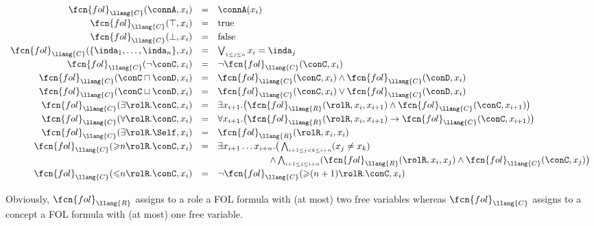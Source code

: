 \[
\begin{array}{rll}
	 \fcn{fol}_{ \llang{C}}(\connA,x_i) & = & \connA(x_i)\\[1mm]
	 \fcn{fol}_{ \llang{C}}(\top,x_i) & = & \mathrm{true}\\[1mm]
	 \fcn{fol}_{ \llang{C}}(\bot,x_i) & = & \mathrm{false}\\[1mm]
	 \fcn{fol}_{ \llang{C}}(\{\inda_1,\ldots,\inda_n\},x_i) & = &\bigvee_{\scriptscriptstyle 1\leq j\leq n} x_i=\inda_j\\[1mm]
	 \fcn{fol}_{ \llang{C}}(\neg\conC,x_i) & = & \neg \fcn{fol}_{ \llang{C}}(\conC,x_i)\\[1mm]
	 \fcn{fol}_{ \llang{C}}(\conC\sqcap\conD,x_i) & = &  \fcn{fol}_{ \llang{C}}(\conC,x_i)\wedge  \fcn{fol}_{ \llang{C}}(\conD,x_i)\\[1mm]
	 \fcn{fol}_{ \llang{C}}(\conC\sqcup\conD,x_i) & = &  \fcn{fol}_{ \llang{C}}(\conC,x_i)\vee  \fcn{fol}_{ \llang{C}}(\conD,x_i)\\[1mm]
	 \fcn{fol}_{ \llang{C}}(\exists\rolR.\conC,x_i) & = & \exists x_{i+1}.\big( \fcn{fol}_{ \llang{R}}(\rolR,x_i,x_{i+1})\wedge  \fcn{fol}_{ \llang{C}}(\conC,x_{i+1})\big)\\[1mm]
	 \fcn{fol}_{ \llang{C}}(\forall\rolR.\conC,x_i) & = & \forall x_{i+1}.\big( \fcn{fol}_{ \llang{R}}(\rolR,x_i,x_{i+1}) \to  \fcn{fol}_{ \llang{C}}(\conC,x_{i+1})\big)\\[1mm]
	 \fcn{fol}_{ \llang{C}}(\exists\rolR.\Self,x_i) & = &  \fcn{fol}_{ \llang{R}}(\rolR,x_i,x_i)\\[1mm]
	 \fcn{fol}_{ \llang{C}}(\mathord{\geqslant}n \rolR.\conC,x_i) & = & \exists x_{i+1}\dots x_{i+n}.\big(\bigwedge_{\scriptscriptstyle i+1\leq j < k \leq i+n}(x_j\not=x_k)\\[1mm]
	& & \hspace{20mm}\wedge\bigwedge_{\scriptscriptstyle i+1\leq j\leq i+n}( \fcn{fol}_{ \llang{R}}(\rolR,x_i,x_j)\wedge  \fcn{fol}_{ \llang{C}}(\conC,x_{j})\big)\\[1mm]
	 \fcn{fol}_{ \llang{C}}(\mathord{\leqslant}n \rolR.\conC,x_i) & = & \neg \fcn{fol}_{ \llang{C}}(\mathord{\geqslant}{(n+1)} \rolR.\conC,x_i)\\[1mm]
\end{array}
\]

Obviously, $\fcn{fol}_ \llang{R}$ assigns to a role a FOL formula with (at most) two free variables whereas $ \fcn{fol}_ \llang{C}$ assigns to a concept a FOL formula with (at most) one free variable. 

